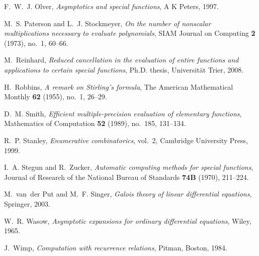 \documentclass[10pt, conference]{IEEEtran}
\begin{document}
\begin{thebibliography}{10}
F.~W.~J. Olver, \emph{Asymptotics and special functions}, A K Peters, 1997.

M.~S. Paterson and L.~J. Stockmeyer, \emph{On the number of nonscalar
  multiplications necessary to evaluate polynomials}, SIAM Journal on Computing
  \textbf{2} (1973), no.~1, 60--66.

M.~Reinhard, \emph{Reduced cancellation in the evaluation of entire functions
  and applications to certain special functions}, Ph.D. thesis, Universität
  Trier, 2008.

H.~Robbins, \emph{A remark on {S}tirling's formula}, The American Mathematical
  Monthly \textbf{62} (1955), no.~1, 26--29.

{D}.~{M}. {S}mith, \emph{{E}fficient multiple-precision evaluation of
  elementary functions}, {M}athematics of {C}omputation \textbf{52} (1989),
  no.~185, 131--134.

R.~P. Stanley, \emph{Enumerative combinatorics}, vol.~2, Cambridge University
  Press, 1999.

I.~A. Stegun and R.~Zucker, \emph{Automatic computing methods for special
  functions}, Journal of Research of the National Bureau of Standards
  \textbf{74B} (1970), 211--224.

M.~van~der Put and M.~F. Singer, \emph{Galois theory of linear differential
  equations}, Springer, 2003.

W.~R. Wasow, \emph{Asymptotic expansions for ordinary differential equations},
  Wiley, 1965.

J.~Wimp, \emph{Computation with recurrence relations}, Pitman, Boston, 1984.

\end{thebibliography}
\end{document}
